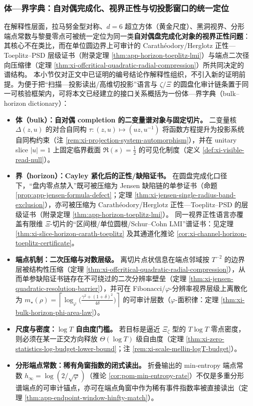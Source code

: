 \subsubsection{体—界字典：自对偶完成化、视界正性与切投影窗口的统一定位}\label{subsubsec:discussion-bulk-horizon-dictionary}
在解释性层面，拉马努金型对称、\(d=6\) 超立方体（黄金尺度）、黑洞视界、分形端点常数与黎曼零点可被统一定位为同一类\textbf{自对偶盘完成化对象的视界正性问题}：其核心不在类比，而在单位圆边界上可审计的 Carath\'eodory/Herglotz 正性—Toeplitz--PSD 层级证书（附录定理 \ref{thm:app-horizon-toeplitz-lmi}）与端点二次径向压缩律（定理 \ref{thm:xi-offcritical-quadratic-radial-compression}）所共同决定的谱结构。
本小节仅对正文中已证明的编号结论作解释性组织，不引入新的证明前提。为便于把“扫描—投影读出/高维切投影”语言与 \(\zeta/\Xi\) 的圆盘化审计链条置于同一可核验框架内，可将本文已经建立的接口关系概括为一份体—界字典（bulk–horizon dictionary）：
\begin{itemize}
  \item \textbf{体（bulk）：自对偶 completion 的二变量谱对象与固定切片。}
  二变量核 \(\Delta(z,u)\) 的对合自同构 \(\tau:(z,u)\mapsto(uz,u^{-1})\) 将函数方程提升为投影系统自同构约束（注 \ref{rem:xi-projection-system-automorphism}），并在 unitary slice \(|u|=1\) 上固定临界截面 \(\Re(s)=\tfrac12\) 的可见化制度（定义 \ref{def:xi-visible-read-null}）。
  \item \textbf{界（horizon）：Cayley 紧化后的正性/缺陷证书。}
  在圆盘完成化口径下，“盘内零点禁入”既可被压缩为 Jensen 缺陷链的单参证书（命题 \ref{prop:app-jensen-formula-defect}；定理 \ref{thm:xi-jensen-single-radius-band-exclusion}），亦可被压缩为 Carath\'eodory/Herglotz 正性—Toeplitz--PSD 的层级证书（附录定理 \ref{thm:app-horizon-toeplitz-lmi}）。
  同一视界正性语言亦覆盖有限维 \(\Xi\)-切片的“区间根/单位圆根/Schur--Cohn LMI”谱证书：见定理 \ref{thm:xi-slice-horizon-carath-toeplitz} 及其通道化推论 \ref{cor:xi-channel-horizon-toeplitz-certificate}。
  \item \textbf{端点机制：二次压缩与对数层级。}
  离切片点状信息在端点邻域按 \(T^{-2}\) 的边界层被结构性压缩（定理 \ref{thm:xi-offcritical-quadratic-radial-compression}），从而单参缺陷证书链存在不可绕过的二次分辨率壁垒（定理 \ref{thm:xi-jensen-quadratic-resolution-barrier}），并可在 Fibonacci/\(\varphi\)-分辨率视界层级上离散化为
  \(m_\star(\rho)=\left\lceil \log_{\varphi}\!\bigl(\frac{\gamma^2+(1+\delta)^2}{4\delta}\bigr)\right\rceil\)
  的可审计层数（\(\varphi\)-面积律：定理 \ref{thm:xi-bulk-horizon-phi-area-law}）。
  \item \textbf{尺度与密度：\texorpdfstring{$\log T$}{log T} 自由度门槛。}
  若目标是逼近 \(\Xi_\zeta\) 型的 \(T\log T\) 零点密度，则必须在某一正交方向释放 \(\Theta(\log T)\) 级自由度（定理 \ref{thm:xi-zero-statistics-log-budget-lower-bound}；注 \ref{rem:xi-scale-mellin-logT-budget}）。
  \item \textbf{分形端点常数：稀有角窗指数的闭式读出。}
  折叠输出的 min-entropy 端点常数 \(h_\infty=\log(2/\sqrt\varphi)\)（推论 \ref{cor:pom-min-entropy-rate}）不仅是多重分形谱端点的可审计锚点，亦可在端点角窗中作为稀有事件指数率被直接读出（定理 \ref{thm:app-endpoint-window-hinfty-match}）。
\end{itemize}
